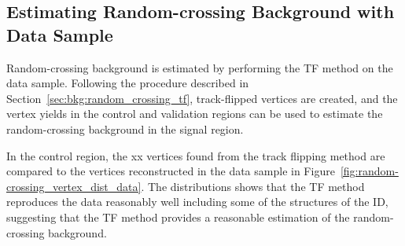 \subsection{Estimating Random-crossing Background with Data Sample}
\label{sec:bkg:random_crossing_data}

Random-crossing background is estimated by performing the TF method on the data sample. Following the procedure described in Section~\ref{sec:bkg:random_crossing_tf}, track-flipped vertices are created, and the vertex yields in the control and validation regions can be used to estimate the random-crossing background in the signal region.

In the control region, the xx vertices found from the track flipping method are compared to the vertices reconstructed in the data sample in Figure~\ref{fig:random-crossing_vertex_dist_data}. The distributions shows that the TF method reproduces the data reasonably well including some of the structures of the ID, suggesting that the TF method provides a reasonable estimation of the random-crossing background.

